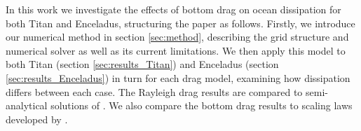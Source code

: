 In this work we investigate the effects of bottom drag on ocean dissipation for both Titan and Enceladus, structuring the paper as follows. Firstly, we introduce our numerical method in section \ref{sec:method}, describing the grid structure and numerical solver as well as its current limitations. We then apply this model to both Titan (section \ref{sec:results_Titan}) and Enceladus (section \ref{sec:results_Enceladus}) in turn for each drag model, examining how dissipation differs between each case. The Rayleigh drag results are compared to semi-analytical solutions of \citet{matsuyama2014tidal}. We also compare the bottom drag results to scaling laws developed by \citet{chen2013tidal}.






